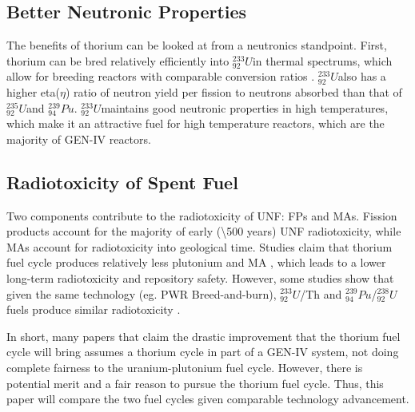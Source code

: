 \documentclass{article}
\newcommand{\uthree}{$^{233}_{92}U$}
\newcommand{\ufive}{$^{235}_{92}U$}%
\newcommand{\ueight}{$^{238}_{92}U$}
\newcommand{\pu}{$^{239}_{94}Pu$}
\begin{document}
\subsection{Better Neutronic Properties}
The benefits of thorium can be looked at from a neutronics standpoint.
First, thorium can be bred relatively efficiently into \uthree in thermal spectrums,
which allow for breeding reactors with comparable conversion ratios \cite{allibert_introduction_2015}.
\uthree also has a higher eta($\eta$) ratio of neutron yield per fission to 
neutrons absorbed than that of \ufive and \pu \cite{lung_perspectives_1998}.
\uthree maintains good neutronic properties in high temperatures,
which make it an attractive fuel for high temperature reactors, which
are the majority of GEN-IV reactors.

\subsection{Radiotoxicity of Spent Fuel}
Two components contribute to the radiotoxicity of 
\gls{UNF}: \glspl{FP} and \glspl{MA}.
Fission products account for the majority of early (\textbackslash 500 years)
\gls{UNF} radiotoxicity, while \glspl{MA} account for 
radiotoxicity into geological time.
Studies claim that thorium fuel cycle produces relatively
less plutonium and \gls{MA} \cite{boczar_thorium_2002} \cite{david_revisiting_2007},
which leads to a lower long-term radiotoxicity and repository safety.
However, some studies show that given the same technology (eg. \gls{PWR} Breed-and-burn),
\uthree/Th and \pu/\ueight fuels produce similar radiotoxicity \cite{croff_comparative_2016}.

In short, many papers that claim the drastic improvement that the thorium
fuel cycle will bring assumes a thorium cycle in part of a GEN-IV system,
not doing complete fairness to the uranium-plutonium fuel cycle. However,
there is potential merit and a fair reason to pursue the thorium fuel cycle.
Thus, this paper will compare the two fuel cycles given comparable technology
advancement. 




%





\end{document}
